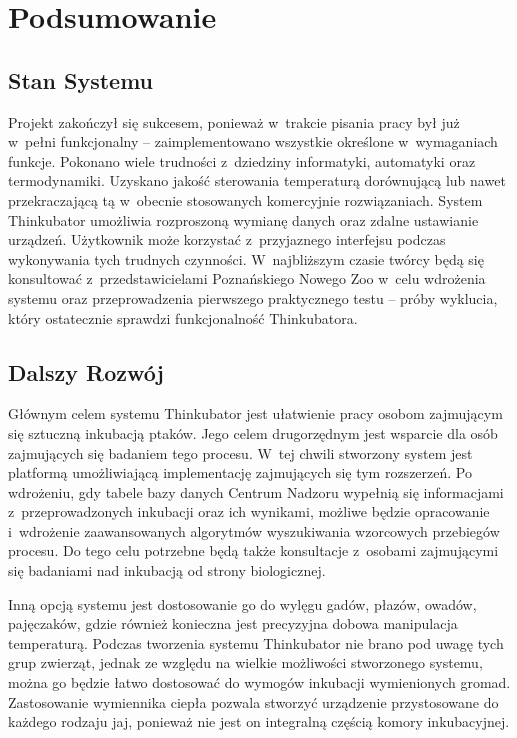 
\chapter{Podsumowanie}
\label{sec:Podsumowanie}

\section{Stan Systemu}
Projekt zakończył się sukcesem, ponieważ w~trakcie pisania pracy był już w~pełni
funkcjonalny -- zaimplementowano wszystkie określone w~wymaganiach funkcje.
Pokonano wiele trudności z~dziedziny informatyki, automatyki oraz termodynamiki.
Uzyskano jakość sterowania temperaturą dorównującą lub nawet przekraczającą tą
w~obecnie stosowanych komercyjnie rozwiązaniach.  System Thinkubator umożliwia
rozproszoną wymianę danych oraz zdalne ustawianie urządzeń.  Użytkownik może
korzystać z~przyjaznego interfejsu podczas wykonywania tych trudnych czynności.
W~najbliższym czasie twórcy będą się konsultować z~przedstawicielami
Poznańskiego Nowego Zoo w~celu wdrożenia systemu oraz przeprowadzenia pierwszego
praktycznego testu -- próby wyklucia, który ostatecznie sprawdzi funkcjonalność
Thinkubatora.

\section{Dalszy Rozwój}
Głównym celem systemu Thinkubator jest ułatwienie pracy osobom zajmującym się
sztuczną inkubacją ptaków. Jego celem drugorzędnym jest wsparcie dla osób
zajmujących się badaniem tego procesu. W~tej chwili stworzony system jest
platformą umożliwiającą implementację zajmujących się tym rozszerzeń. Po
wdrożeniu, gdy tabele bazy danych Centrum Nadzoru wypełnią się informacjami
z~przeprowadzonych inkubacji oraz ich wynikami, możliwe będzie opracowanie
i~wdrożenie zaawansowanych algorytmów wyszukiwania wzorcowych przebiegów
procesu. Do tego celu potrzebne będą także konsultacje z~osobami zajmującymi się
badaniami nad inkubacją od strony biologicznej. 

Inną opcją systemu jest dostosowanie go do wylęgu gadów, płazów, owadów,
pajęczaków, gdzie również konieczna jest precyzyjna dobowa manipulacja
temperaturą. Podczas tworzenia systemu Thinkubator nie brano pod uwagę tych grup
zwierząt, jednak ze względu na wielkie możliwości stworzonego systemu, można go
będzie łatwo dostosować do wymogów inkubacji wymienionych gromad.  Zastosowanie
wymiennika ciepła pozwala stworzyć urządzenie przystosowane do każdego rodzaju
jaj, ponieważ nie jest on integralną częścią komory inkubacyjnej.
 
